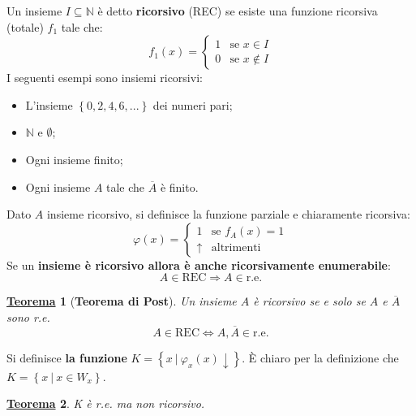 \documentclass[a4paper]{article}
\newtheorem{theorem}{\textcolor{Red3}{\underline{Teorema}}}
\begin{document}
	\noindent
	Un insieme $I \subseteq \mathbb{N}$ è detto \textcolor{Red3}{\textbf{ricorsivo}} (REC) se esiste una funzione ricorsiva (totale) $f_{1}$ tale che:
	\begin{equation*}
		f_{1}\left(x\right) = \begin{cases}
			1 & \text{se } x \in I \\
			0 & \text{se } x \notin I
		\end{cases}
	\end{equation*}
	I seguenti esempi sono insiemi ricorsivi:
	\begin{itemize}
		\item L'insieme $\left\{0,2,4,6,...\right\}$ dei numeri pari;
		\item $\mathbb{N}$ e $\emptyset$;
		\item Ogni insieme finito;
		\item Ogni insieme $A$ tale che $\overline{A}$ è finito.
	\end{itemize}
	Dato $A$ insieme ricorsivo, si definisce la funzione parziale e chiaramente ricorsiva:
	\begin{equation*}
		\varphi\left(x\right) = \begin{cases}
			1 & \text{se } f_{A}\left(x\right) = 1 \\
			\uparrow & \text{altrimenti}
		\end{cases}
	\end{equation*}
	Se un \textbf{insieme è ricorsivo allora è anche ricorsivamente enumerabile}:
	\begin{equation*}
		A \in \mathrm{REC} \Longrightarrow A \in \mathrm{r.e.}
	\end{equation*}
	\begin{theorem}[\textbf{Teorema di Post}]
		Un insieme $A$ è ricorsivo se e solo se $A$ e $\overline{A}$ sono r.e.
		\begin{equation*}
			A \in \mathrm{REC} \iff A, \overline{A} \in \mathrm{r.e.}
		\end{equation*}
	\end{theorem}
	\noindent
	Si definisce \textbf{la funzione} $K = \left\{x \: | \: \varphi_{x}\left(x\right) \downarrow\right\}$. È chiaro per la definizione che $K = \left\{x \: | \: x \in W_{x}\right\}$.
	\begin{theorem}
		K è r.e. ma non ricorsivo.
	\end{theorem}
\end{document}
